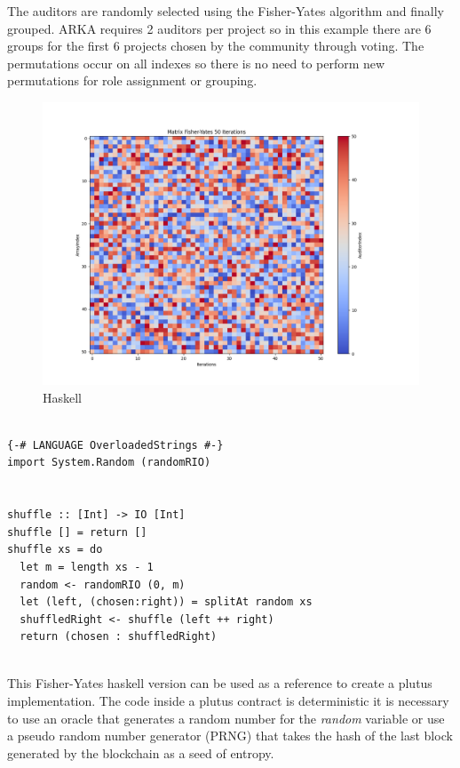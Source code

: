 \documentclass[12pt]{article}
\begin{document}
The auditors are randomly selected using the Fisher-Yates algorithm and finally grouped. ARKA requires 2 auditors per project so in this example there are 6 groups for the first 6 projects chosen by the community through voting. The permutations occur on all indexes so there is no need to perform new permutations for role assignment or grouping.


\begin{figure}[ht]
  \centering
  \includegraphics[width=1\textwidth]{haskell-matrix.png}
  \caption{Haskell
  }
  \label{fig:haskell-matrix}
\end{figure}


\begin{tcolorbox}[title=Haskell Code]
\begin{verbatim}

{-# LANGUAGE OverloadedStrings #-}
import System.Random (randomRIO)


shuffle :: [Int] -> IO [Int]
shuffle [] = return []
shuffle xs = do
  let m = length xs - 1
  random <- randomRIO (0, m)
  let (left, (chosen:right)) = splitAt random xs
  shuffledRight <- shuffle (left ++ right)
  return (chosen : shuffledRight)


\end{verbatim}
\end{tcolorbox}


This Fisher-Yates haskell version can be used as a reference to create a plutus implementation. The code inside a plutus contract is deterministic it is necessary to use an oracle that generates a random number for the \emph {random} variable or use a pseudo random number generator (PRNG) that takes the hash of the last block generated by the blockchain as a seed of entropy.
\end{document}
